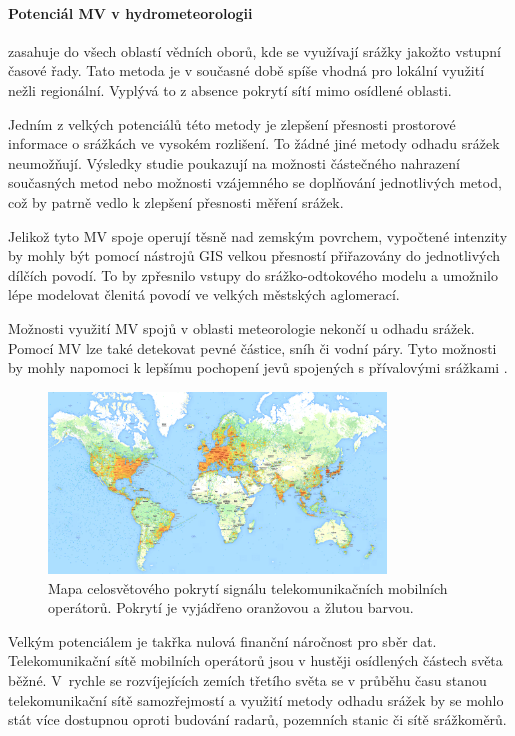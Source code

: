 \documentclass[a4paper,12pt,oneside]{report}
\begin{document}
\paragraph*{Potenciál MV v hydrometeorologii} zasahuje do všech
oblastí vědních oborů, kde se využívají srážky jakožto vstupní časové
řady. Tato metoda je v současné době spíše vhodná pro lokální využití
nežli regionální. Vyplývá to z absence pokrytí sítí mimo osídlené
oblasti.

Jedním z velkých potenciálů této metody je zlepšení přesnosti
prostorové informace o srážkách ve vysokém rozlišení. To žádné jiné
metody odhadu srážek neumožňují. Výsledky studie \cite{mv2} poukazují na
možnosti částečného nahrazení současných metod nebo možnosti
vzájemného se doplňování jednotlivých metod, což by patrně vedlo k
zlepšení přesnosti měření srážek.

Jelikož tyto MV spoje operují těsně nad zemským povrchem, vypočtené
intenzity by mohly být pomocí nástrojů \acs{GIS} velkou přesností
přiřazovány do jednotlivých dílčích povodí. To by zpřesnilo vstupy do
srážko-odtokového modelu a umožnilo lépe modelovat členitá povodí ve velkých městských aglomerací.

Možnosti využití MV spojů v oblasti meteorologie nekončí u odhadu
srážek. Pomocí MV lze také detekovat pevné částice, sníh či vodní
páry. Tyto možnosti by mohly napomoci k lepšímu pochopení jevů
spojených s přívalovými srážkami \cite{mv2}.
\begin{figure}[h!]
    \centering
    \includegraphics[width=0.8\textwidth]{./img/srazky/opensignalmap.png}
    \caption[Porytí tel. sítí]{\centering Mapa celosvětového pokrytí signálu telekomunikačních mobilních operátorů. Pokrytí je vyjádřeno oranžovou a žlutou barvou. \footnotemark }
 \end{figure}   

Velkým potenciálem je takřka nulová finanční náročnost pro sběr
dat. Telekomunikační sítě mobilních operátorů jsou v hustěji
osídlených částech světa běžné. V~rychle se rozvíjejících zemích
třetího světa se v průběhu času stanou telekomunikační sítě
samozřejmostí a využití metody odhadu srážek by se mohlo stát více
dostupnou oproti budování radarů, pozemních stanic či sítě
srážkoměrů.
 
\end{document}
